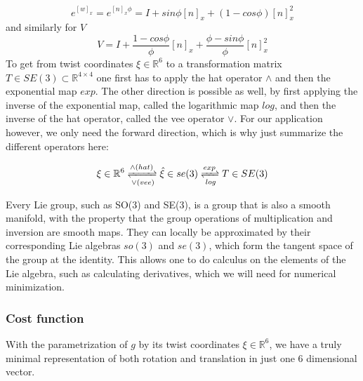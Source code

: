 \documentclass[12pt, a4paper]{article}
\begin{document}
\[
e^{[w]_x} = e^{[n]_x\phi} = I + 	sin\phi [n]_x + (1-cos\phi) 	[n]_x^2
\]
and similarly for $V$
\[
V = I + \frac{1-cos\phi}{\phi}[n]_x + \frac{\phi-sin\phi}{\phi} [n]_x^2
\]
To get from twist coordinates $\xi \in \mathbb{R}^6$ to a transformation matrix $T \in SE(3) \subset \mathbb{R}^{4\times4}$ one first has to apply the hat operator $\wedge$ and then the exponential map $exp$. The other direction is possible as well, by first applying the inverse of the exponential map, called the logarithmic map $log$, and then the inverse of the hat operator, called the vee operator $\vee$. For our application however, we only need the forward direction, which is why just summarize the different operators here:

\begin{displaymath}
\xi \in \mathbb{R}^6 \xrightleftharpoons[\vee (vee)]{\wedge (hat) } \hat{\xi} \in se(3) \xrightleftharpoons[log]{exp} T \in SE(3)
\end{displaymath}

Every Lie group, such as SO(3) and SE(3), is a group that is also a smooth manifold, with the property that the group operations of multiplication and inversion are smooth maps. They can locally be approximated by their corresponding Lie algebras $so(3)$ and $se(3)$, which form the tangent space of the group at the identity. This allows one to do calculus on the elements of the Lie algebra, such as calculating derivatives, which we will need for numerical minimization.


\subsubsection{Cost function}
With the parametrization of $g$ by its twist coordinates $\xi \in \mathbb{R}^6$, we have a truly minimal representation of both rotation and translation in just one 6 dimensional vector.
\end{document}
